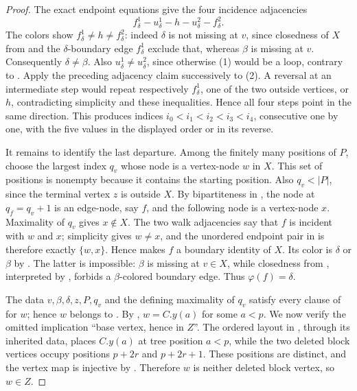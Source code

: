 \begin{proof}
The exact endpoint equations give the four incidence adjacencies
\[
 f^1_\delta-u^1_\delta-h-u^2_\delta-f^2_\delta.           \tag{2}
\]
The colors show $f^1_\delta\ne h\ne f^2_\delta$: indeed $\delta$ is not
missing at $v$, since closedness of $X$ from
 and the $\delta$-boundary edge
$f^1_\delta$ exclude that, whereas $\beta$ is missing at $v$.
Consequently $\delta\ne\beta$.  Also
$u^1_\delta\ne u^2_\delta$, since otherwise (1) would be a loop,
contrary to .  Apply the preceding adjacency
claim successively to (2).  A reversal at an intermediate step would
repeat respectively $f^1_\delta$, one of the two outside vertices, or
$h$, contradicting simplicity and these inequalities.  Hence all four
steps point in the same direction.  This produces indices
$i_0<i_1<i_2<i_3<i_4$, consecutive one by one, with the five values in
the displayed order or in its reverse.

It remains to identify the last departure.  Among the finitely many
positions of $P$, choose the largest index $q_v$ whose node is a
vertex-node $w$ in $X$.  This set of positions is nonempty because it
contains the starting position.  Also $q_v<|P|$, since the terminal
vertex $z$ is outside $X$.  By bipartiteness in
, the node at $q_f=q_v+1$ is an edge-node,
say $f$, and the following node is a vertex-node $x$.  Maximality of
$q_v$ gives $x\notin X$.  The two walk adjacencies say that $f$ is
incident with $w$ and $x$; simplicity gives $w\ne x$, and the unordered
endpoint pair in  is therefore exactly
$\{w,x\}$.  Hence  makes $f$ a boundary identity
of $X$.  Its color is $\delta$ or $\beta$ by
.  The latter is impossible: $\beta$ is
missing at $v\in X$, while closedness from
, interpreted by
, forbids a $\beta$-colored boundary
edge.  Thus $\varphi(f)=\delta$.

The data $v,\beta,\delta,z,P,q_v$ and the defining maximality of $q_v$
satisfy every clause of  for $w$; hence $w$
belongs to .  By
, $w=C.y(a)$ for some $a<p$.
We now verify the omitted implication ``base vertex, hence in $Z$''.
The ordered layout in , through
its inherited  data, places
$C.y(a)$ at tree position $a<p$, while the two deleted block vertices
occupy positions $p+2r$ and $p+2r+1$.  These positions are distinct, and
the vertex map is injective by .  Therefore $w$
is neither deleted block vertex, so $w\in Z$.


\end{proof}

